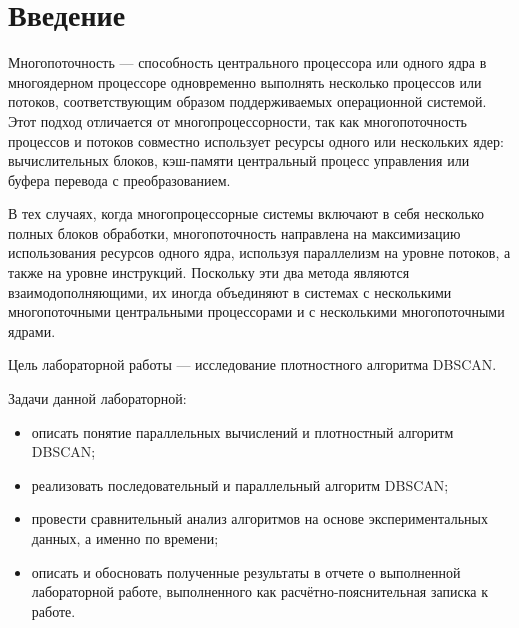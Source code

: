 \chapter*{Введение}

Многопоточность \cite{mnogo} --- способность центрального процессора или одного ядра в многоядерном процессоре одновременно выполнять несколько процессов или потоков, соответствующим образом поддерживаемых операционной системой.
Этот подход отличается от многопроцессорности, так как многопоточность процессов и потоков совместно использует ресурсы одного или нескольких ядер: вычислительных блоков, кэш-памяти центральный процесс управления или буфера перевода с преобразованием.

В тех случаях, когда многопроцессорные системы включают в себя несколько полных блоков обработки, многопоточность направлена на максимизацию использования ресурсов одного ядра, используя параллелизм на уровне потоков, а также на уровне инструкций.
Поскольку эти два метода являются взаимодополняющими, их иногда объединяют в системах с несколькими многопоточными центральными процессорами и с несколькими многопоточными ядрами.

Цель лабораторной работы --- исследование плотностного алгоритма DBSCAN.

\newpage

Задачи данной лабораторной:

\begin{itemize}
	\item описать понятие параллельных вычислений и плотностный алгоритм DBSCAN;
	\item реализовать последовательный и параллельный алгоритм DBSCAN;
	\item провести сравнительный анализ алгоритмов на основе экспериментальных данных, а именно по времени;
	\item описать и обосновать полученные результаты в отчете о выполненной лабораторной работе, выполненного как расчётно-пояснительная записка к работе.
\end{itemize}
